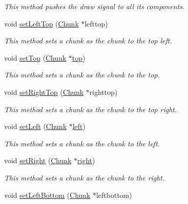 \begin{DoxyCompactItemize}
\begin{DoxyCompactList}\small\item\em This method pushes the draw signal to all its components. \end{DoxyCompactList}\item 
void \hyperlink{class_chunk_a24564a4a5eb9e05857939e23ed213914}{set\-Left\-Top} (\hyperlink{class_chunk}{Chunk} $\ast$lefttop)
\begin{DoxyCompactList}\small\item\em This method sets a chunk as the chunk to the top left. \end{DoxyCompactList}\item 
void \hyperlink{class_chunk_a6cc69f33389b5510766f23317ff7ae65}{set\-Top} (\hyperlink{class_chunk}{Chunk} $\ast$\hyperlink{_chunk_8hpp_ab91b34ae619fcdfcba4522b4f335bf83a3961740aa293a50c701d278225f7050a}{top})
\begin{DoxyCompactList}\small\item\em This method sets a chunk as the chunk to the top. \end{DoxyCompactList}\item 
void \hyperlink{class_chunk_a8c19057f7360349f5d214bfa50d51900}{set\-Right\-Top} (\hyperlink{class_chunk}{Chunk} $\ast$righttop)
\begin{DoxyCompactList}\small\item\em This method sets a chunk as the chunk to the top right. \end{DoxyCompactList}\item 
void \hyperlink{class_chunk_aa0005654a92c0ca50f90c516d508834c}{set\-Left} (\hyperlink{class_chunk}{Chunk} $\ast$\hyperlink{_chunk_8hpp_ab91b34ae619fcdfcba4522b4f335bf83ab0ac36b187aa60c167ffcead3d5a03c0}{left})
\begin{DoxyCompactList}\small\item\em This method sets a chunk as the chunk to the left. \end{DoxyCompactList}\item 
void \hyperlink{class_chunk_a670d58217b329583811b5380f25700d6}{set\-Right} (\hyperlink{class_chunk}{Chunk} $\ast$\hyperlink{_chunk_8hpp_ab91b34ae619fcdfcba4522b4f335bf83af763d610923b0c4614e8ecd65212666a}{right})
\begin{DoxyCompactList}\small\item\em This method sets a chunk as the chunk to the right. \end{DoxyCompactList}\item 
void \hyperlink{class_chunk_a690d801cad525f106f11fca76855c785}{set\-Left\-Bottom} (\hyperlink{class_chunk}{Chunk} $\ast$leftbottom)

\end{DoxyCompactItemize}
